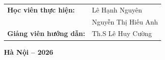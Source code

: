 \begin{titlepage}
    \vspace{2.0cm}
    
    \begin{flushleft}
        \hspace{2.5cm} 
        \begin{tabular}{ll}
            \fontsize{12}{14}\selectfont\textbf{Học viên thực hiện:} & \fontsize{12}{14}\selectfont Lê Hạnh Nguyên \\
             & \fontsize{12}{14}\selectfont Nguyễn Thị Hiếu Anh \\ %
            \fontsize{12}{14}\selectfont\textbf{Giảng viên hướng dẫn:} & \fontsize{12}{14}\selectfont Th.S Lê Huy Cường
        \end{tabular}
    \end{flushleft}
    
    \vfill
    
    {\fontsize{12}{14}\selectfont\textbf{Hà Nội – 2026}\\}
    \vspace*{0.4cm}
    
\end{titlepage}
